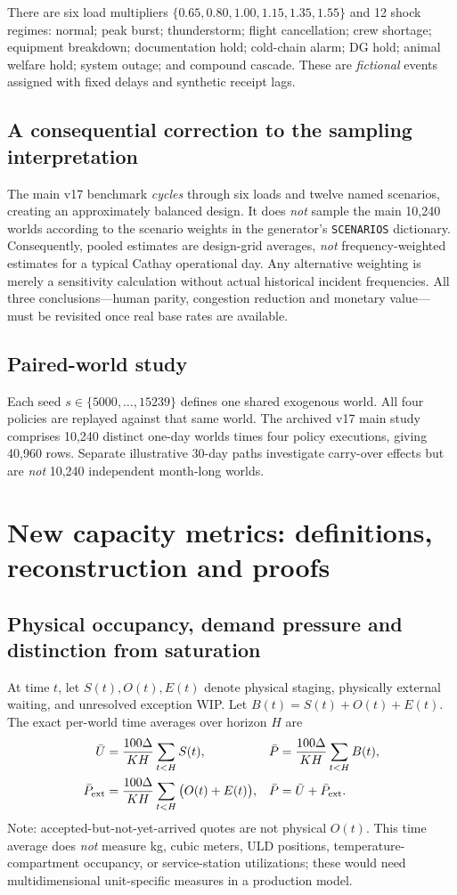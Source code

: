 \documentclass[10pt,a4paper]{article}
\theoremstyle{definition}\newtheorem{definition}[theorem]{Definition}
\theoremstyle{remark}\newtheorem{remark}[theorem]{Remark}
\newcommand{\1}{\mathbbm 1}
\begin{document}
There are six load multipliers $\{0.65,0.80,1.00,1.15,1.35,1.55\}$ and 12 shock regimes: normal; peak burst; thunderstorm; flight cancellation; crew shortage; equipment breakdown; documentation hold; cold-chain alarm; DG hold; animal welfare hold; system outage; and compound cascade. These are \emph{fictional} events assigned with fixed delays and synthetic receipt lags.

\subsection{A consequential correction to the sampling interpretation}
The main v17 benchmark \emph{cycles} through six loads and twelve named scenarios, creating an approximately balanced design. It does \emph{not} sample the main 10,240 worlds according to the scenario weights in the generator's \texttt{SCENARIOS} dictionary. Consequently, pooled estimates are design-grid averages, \emph{not} frequency-weighted estimates for a typical Cathay operational day. Any alternative weighting is merely a sensitivity calculation without actual historical incident frequencies. All three conclusions---human parity, congestion reduction and monetary value---must be revisited once real base rates are available.

\subsection{Paired-world study}
Each seed $s\in\{5000,\ldots,15239\}$ defines one shared exogenous world. All four policies are replayed against that same world. The archived v17 main study comprises 10,240 distinct one-day worlds times four policy executions, giving 40,960 rows. Separate illustrative 30-day paths investigate carry-over effects but are \emph{not} 10,240 independent month-long worlds.

\section{New capacity metrics: definitions, reconstruction and proofs}
\subsection{Physical occupancy, demand pressure and distinction from saturation}
At time $t$, let $S(t),O(t),E(t)$ denote physical staging, physically external waiting, and unresolved exception WIP. Let $B(t)=S(t)+O(t)+E(t)$. The exact per-world time averages over horizon $H$ are
\begin{align}
\bar U&=\frac{100\Delta}{KH}\sum_{t<H}S(t),
&\bar P&=\frac{100\Delta}{KH}\sum_{t<H}B(t),\\
\bar P_{\rm ext}&=\frac{100\Delta}{KH}\sum_{t<H}\big(O(t)+E(t)\big),
&\bar P&=\bar U+\bar P_{\rm ext}.\label{eq:identity}
\end{align}
Note: accepted-but-not-yet-arrived quotes are not physical $O(t)$. This time average does \emph{not} measure kg, cubic meters, ULD positions, temperature-compartment occupancy, or service-station utilizations; these would need multidimensional unit-specific measures in a production model.
\end{document}
